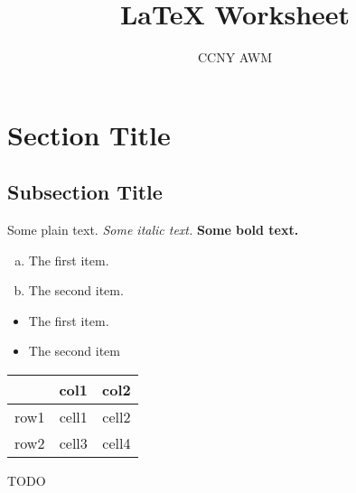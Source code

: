 \documentclass[11pt, reqno]{amsart}
\theoremstyle{plain}
\theoremstyle{definition}
\theoremstyle{example}
\begin{document}
\title{LaTeX Worksheet}
\author{CCNY AWM}
\maketitle

\section{Section Title}
\subsection{Subsection Title}
Some plain text. 
\textit{Some italic text.}
\textbf{Some bold text.}

\begin{enumerate}[a)]
	\item The first item.
	\item The second item.
\end{enumerate}

\begin{itemize}
	\item The first item. 
	\item The second item
\end{itemize}

\begin{center}
	\begin{tabular}{ | c || c | c | } \hline
			 & col1  & col2  \\ \hline \hline
		row1 & cell1 & cell2 \\ \hline 
		row2 & cell3 & cell4 \\ \hline
	\end{tabular}
\end{center}

TODO

\end{document}
